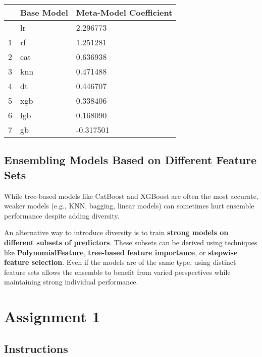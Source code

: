 \documentclass[
  letterpaper,
  DIV=11,
  numbers=noendperiod]{scrreprt}
\begin{document}
\begin{longtable}[]{@{}lll@{}}
\toprule\noalign{}
& Base Model & Meta-Model Coefficient \\
\midrule\noalign{}
\endhead
\bottomrule\noalign{}
\endlastfoot
0 & lr & 2.296773 \\
1 & rf & 1.251281 \\
2 & cat & 0.636938 \\
3 & knn & 0.471488 \\
4 & dt & 0.446707 \\
5 & xgb & 0.338406 \\
6 & lgb & 0.168090 \\
7 & gb & -0.317501 \\
\end{longtable}

\section{Ensembling Models Based on Different Feature
Sets}\label{ensembling-models-based-on-different-feature-sets}

While tree-based models like CatBoost and XGBoost are often the most
accurate, weaker models (e.g., KNN, bagging, linear models) can
sometimes hurt ensemble performance despite adding diversity.

An alternative way to introduce diversity is to train \textbf{strong
models on different subsets of predictors}. These subsets can be derived
using techniques like \textbf{PolynomialFeature}, \textbf{tree-based
feature importance}, or \textbf{stepwise feature selection}. Even if the
models are of the same type, using distinct feature sets allows the
ensemble to benefit from varied perspectives while maintaining strong
individual performance.

\cleardoublepage
{}
{}
\appendix

\chapter{Assignment 1}\label{assignment-1}

\section*{Instructions}\label{instructions}

\end{document}
